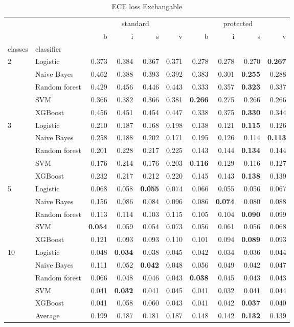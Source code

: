 \begin{table}
\caption{ECE loss Exchangable}
\begin{tabular}{l|l|rrrr|rrrr}
\toprule
 &  & \multicolumn{4}{c}{standard} & \multicolumn{4}{c}{protected} \\
 &  & b & i & s & v & b & i & s & v \\
classes & classifier &  &  &  &  &  &  &  &  \\
\midrule
\midrule
\multirow[c]{5}{*}{2} & Logistic & 0.373 & 0.384 & 0.367 & 0.371 & 0.278 & 0.278 & 0.270 & \textbf{0.267} \\
 & Naive Bayes & 0.462 & 0.388 & 0.393 & 0.392 & 0.383 & 0.301 & \textbf{0.255} & 0.288 \\
 & Random forest & 0.429 & 0.456 & 0.446 & 0.443 & 0.333 & 0.357 & \textbf{0.323} & 0.337 \\
 & SVM & 0.366 & 0.382 & 0.366 & 0.381 & \textbf{0.266} & 0.275 & 0.266 & 0.266 \\
 & XGBoost & 0.456 & 0.451 & 0.454 & 0.447 & 0.338 & 0.375 & \textbf{0.330} & 0.344 \\
\midrule
\multirow[c]{5}{*}{3} & Logistic & 0.210 & 0.187 & 0.168 & 0.198 & 0.138 & 0.121 & \textbf{0.115} & 0.126 \\
 & Naive Bayes & 0.258 & 0.188 & 0.202 & 0.171 & 0.195 & 0.126 & 0.114 & \textbf{0.113} \\
 & Random forest & 0.201 & 0.228 & 0.217 & 0.225 & 0.143 & 0.144 & \textbf{0.134} & 0.144 \\
 & SVM & 0.176 & 0.214 & 0.176 & 0.203 & \textbf{0.116} & 0.129 & 0.116 & 0.127 \\
 & XGBoost & 0.232 & 0.217 & 0.212 & 0.220 & 0.145 & 0.143 & \textbf{0.138} & 0.139 \\
\midrule
\multirow[c]{5}{*}{5} & Logistic & 0.068 & 0.058 & \textbf{0.055} & 0.074 & 0.066 & 0.055 & 0.056 & 0.067 \\
 & Naive Bayes & 0.156 & 0.086 & 0.084 & 0.096 & 0.086 & \textbf{0.074} & 0.080 & 0.088 \\
 & Random forest & 0.113 & 0.114 & 0.103 & 0.115 & 0.105 & 0.104 & \textbf{0.090} & 0.099 \\
 & SVM & \textbf{0.054} & 0.059 & 0.054 & 0.073 & 0.056 & 0.061 & 0.056 & 0.068 \\
 & XGBoost & 0.121 & 0.093 & 0.093 & 0.110 & 0.101 & 0.094 & \textbf{0.089} & 0.093 \\
\midrule
\multirow[c]{5}{*}{10} & Logistic & 0.048 & \textbf{0.034} & 0.038 & 0.045 & 0.042 & 0.034 & 0.036 & 0.044 \\
 & Naive Bayes & 0.111 & 0.052 & \textbf{0.042} & 0.048 & 0.056 & 0.049 & 0.042 & 0.047 \\
 & Random forest & 0.066 & 0.048 & 0.046 & 0.043 & \textbf{0.038} & 0.045 & 0.043 & 0.043 \\
 & SVM & 0.041 & \textbf{0.032} & 0.041 & 0.045 & 0.041 & 0.032 & 0.041 & 0.044 \\
 & XGBoost & 0.041 & 0.058 & 0.060 & 0.043 & 0.041 & 0.042 & \textbf{0.037} & 0.040 \\\midrule\ & Average & 0.199 & 0.187 & 0.181 & 0.187 & 0.148 & 0.142 & \textbf{0.132} & 0.139 \\
\bottomrule
\end{tabular}
\end{table}
